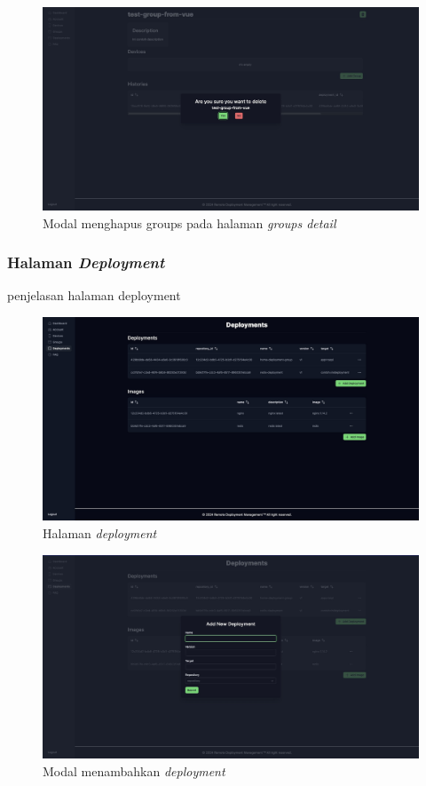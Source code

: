 \begin{figure}
  \centering
  \includegraphics[width=1\textwidth]{resources/chapter-4/dashboard/groups-detail-delete.jpg}
  \caption{Modal menghapus groups pada halaman \textit{groups detail}}
  \label{fig:halaman-groups-detail-delete}
\end{figure}


\subsubsection{Halaman \textit{Deployment}}
penjelasan halaman deployment
\begin{figure}[h]
  \centering
  \includegraphics[width=1\textwidth]{resources/chapter-4/dashboard/deployment-page.jpg}
  \caption{Halaman \textit{deployment}}
  \label{fig:halaman-deployment}
\end{figure}

\begin{figure}[h]
  \centering
  \includegraphics[width=1\textwidth]{resources/chapter-4/dashboard/deployment-page-add-deployment.jpg}
  \caption{Modal menambahkan \textit{deployment}}
  \label{fig:halaman-deployment-add-deployment}
\end{figure}

